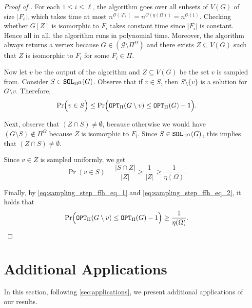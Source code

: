\documentclass[letterpaper,11pt]{article}
\newcommand{\abs}[1]{{\left| #1\right|}}
\newcommand{\1}[1]{\mathds{1}\left[#1\right]}
\newcommand{\sat}{\textnormal{\texttt{SOL}}}
\newcommand{\OPT}{\textnormal{\texttt{OPT}}}
\newcommand{\Oh}{\mathcal{O}}
\begin{document}
\begin{proof}[Proof of ]
	For each $1 \leq i \leq \ell$, the algorithm goes over all subsets of
	$V(G)$ of size $\abs{F_i}$, which takes time at most
	$n^{\Oh(\abs{F_i})} = n^{\Oh( \eta(\Omega))} = n^{\Oh(1)}$. Checking
	whether $G[Z]$ is isomorphic to $F_i$ takes constant time since
	$\abs{F_i}$ is constant. Hence all in all, the algorithm runs in
	polynomial time.
	Moreover, the algorithm always returns a vertex because
	$G \in \left( \mathcal{G} \setminus \Pi^{\Omega} \right)$
	and there exists $Z \subseteq V(G)$ such that $Z$ is isomorphic to
	$F_i$ for some $F_i \in \Pi$.

	Now let $v$ be the output of the algorithm and $Z \subseteq V(G)$
	be the set $v$ is sampled from.
	Consider $S \in \sat_{\Pi^{\Omega}}(G)$.
	Observe that if $v \in S$, then $S \setminus \{v\}$ is a solution for $G \setminus v$.
	Therefore,
	\begin{equation}\label{eq:sampling_step_ffh_eq_1}
		\Pr\Bigl(v \in S\Bigr) \leq \Pr\Bigl( \OPT_\Pi(G \setminus v) \leq \OPT_\Pi(G) - 1 \Bigr).
	\end{equation}

	Next, observe that $(Z \cap S) \neq \emptyset$, because otherwise we would
	have $(G\setminus S) \not\in \Pi^{\Omega}$ because $Z$ is isomorphic to $F_i$.
	Since $S \in \sat_{\Pi^{\Omega}}(G)$, this implies that $(Z \cap S) \neq \emptyset$.
	
	Since $v \in Z$ is sampled uniformly, we get
	\begin{equation}\label{eq:sampling_step_ffh_eq_2}
		\Pr\left( v \in S \right) = \frac{\abs{S \cap Z}}{\abs{Z}} \geq \frac{1}{\abs{Z}} \geq \frac{1}{\eta(\Omega)}.
	\end{equation}

	Finally, by \eqref{eq:sampling_step_ffh_eq_1} and \eqref{eq:sampling_step_ffh_eq_2}, it holds that
	\begin{equation*}
		\Pr\Bigl( \OPT_\Pi(G \setminus v) \leq \OPT_\Pi(G) - 1 \Bigr) \geq \frac{1}{\eta(\Omega)}.
	\end{equation*}
\end{proof}

 

 
\section{Additional Applications}
\label{sec:addtl_applications}
In this section, following \cref{sec:applications}, we present additional applications of our results.
\end{document}
